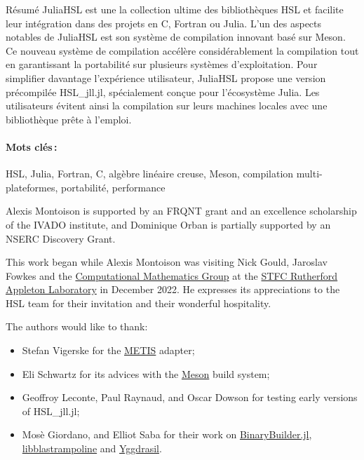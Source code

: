 \documentclass[gdweb]{geradwp}
\newcommand{\HSLjll}{HSL\_jll.jl}
\begin{document}
\begin{GDabstract}{R\'esum\'e}
JuliaHSL est une la collection ultime des bibliothèques HSL et facilite leur intégration dans des projets en C, Fortran ou Julia.
L'un des aspects notables de JuliaHSL est son système de compilation innovant basé sur Meson.
Ce nouveau système de compilation accélère considérablement la compilation tout en garantissant la portabilité sur plusieurs systèmes d'exploitation.
Pour simplifier davantage l'expérience utilisateur, JuliaHSL propose une version précompilée \HSLjll, spécialement conçue pour l'écosystème Julia.
Les utilisateurs évitent ainsi la compilation sur leurs machines locales avec une bibliothèque prête à l'emploi.

\paragraph{Mots cl\'es\,: }
HSL, Julia, Fortran, C, alg\`ebre lin\'eaire creuse, Meson, compilation multi-plateformes, portabilit\'e, performance
\end{GDabstract}

\begin{GDacknowledgements}
Alexis Montoison is supported by an FRQNT grant and an excellence scholarship of the IVADO institute, and Dominique Orban is partially supported by an NSERC Discovery Grant.

This work began while Alexis Montoison was visiting Nick Gould, Jaroslav Fowkes and the \href{https://www.numerical.rl.ac.uk/}{Computational Mathematics Group} at the \href{https://www.ukri.org/about-us/stfc/locations/rutherford-appleton-laboratory/}{STFC Rutherford Appleton Laboratory} in December 2022.
He expresses its appreciations to the HSL team for their invitation and their wonderful hospitality.

The authors would like to thank:
\begin{itemize}
  \item Stefan Vigerske for the \href{https://github.com/KarypisLab/METIS}{METIS} adapter;
  \item Eli Schwartz for its advices with the \href{https://mesonbuild.com/}{Meson} build system;
  \item Geoffroy Leconte, Paul Raynaud, and Oscar Dowson for testing early versions of \HSLjll;
  \item Mosè Giordano, and Elliot Saba for their work on \href{https://github.com/JuliaPackaging/BinaryBuilder.jl}{BinaryBuilder.jl}, \href{https://github.com/JuliaLinearAlgebra/libblastrampoline}{libblastrampoline} and \href{https://github.com/JuliaPackaging/Yggdrasil}{Yggdrasil}.
\end{itemize}
\end{GDacknowledgements}
\end{document}
